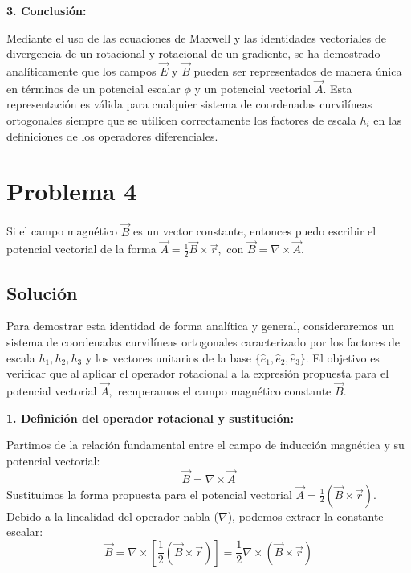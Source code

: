 \documentclass[a4paper]{article}
\begin{document}
\textbf{3. Conclusión:}

Mediante el uso de las ecuaciones de Maxwell y las identidades vectoriales de divergencia de un rotacional y rotacional de un gradiente, se ha demostrado analíticamente que los campos $\vec{E}$ y $\vec{B}$ pueden ser representados de manera única en términos de un potencial escalar $\phi$ y un potencial vectorial $\vec{A}$. Esta representación es válida para cualquier sistema de coordenadas curvilíneas ortogonales siempre que se utilicen correctamente los factores de escala $h_i$ en las definiciones de los operadores diferenciales.



\section{Problema 4}
Si el campo magnético $\vec{B}$ es un vector constante, entonces puedo escribir el potencial vectorial de la forma $\vec{A} = \frac{1}{2} \vec{B} \times \vec{r},$ con $\vec{B} = \nabla \times \vec{A}.$

\subsection{Solución}

Para demostrar esta identidad de forma analítica y general, consideraremos un sistema de coordenadas curvilíneas ortogonales caracterizado por los factores de escala $h_1, h_2, h_3$ y los vectores unitarios de la base $\{\hat{e}_1, \hat{e}_2, \hat{e}_3\}$. El objetivo es verificar que al aplicar el operador rotacional a la expresión propuesta para el potencial vectorial $\vec{A},$ recuperamos el campo magnético constante $\vec{B}$.

\textbf{1. Definición del operador rotacional y sustitución:}

Partimos de la relación fundamental entre el campo de inducción magnética y su potencial vectorial:
\begin{equation}
\vec{B} = \nabla \times \vec{A}
\end{equation}
Sustituimos la forma propuesta para el potencial vectorial $\vec{A} = \frac{1}{2} (\vec{B} \times \vec{r})$. Debido a la linealidad del operador nabla ($\nabla$), podemos extraer la constante escalar:
\begin{equation}
\vec{B} = \nabla \times \left[ \frac{1}{2} (\vec{B} \times \vec{r}) \right] = \frac{1}{2} \nabla \times (\vec{B} \times \vec{r})
\end{equation}
\end{document}
